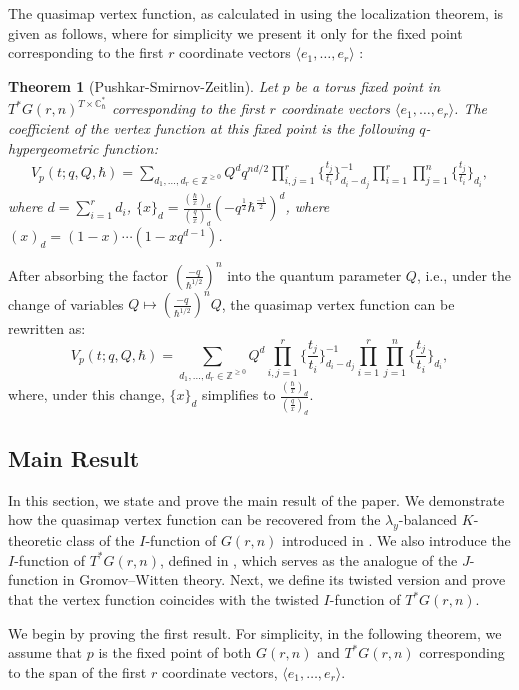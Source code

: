 \documentclass{amsart}
\newtheorem{thm}{Theorem}[section]
\begin{document}
The quasimap vertex function, as calculated in \cite[Proposition 4]{PSZ} using the localization theorem, is given as follows, where for simplicity we present it only for the fixed point corresponding to the first $r$ coordinate vectors $\langle e_{1},\dots,e_{r}\rangle$ :
    \begin{thm} [Pushkar-Smirnov-Zeitlin]
        \label{lemma:proj} Let $p$ be a torus fixed point in $T^*G(r,n)^{T \times \mathbb{C}_{\hbar}^*}$ corresponding to the first $r$ coordinate vectors $\langle e_1,\dots,e_r \rangle$. The coefficient of the vertex function at this fixed point is the following $q$-hypergeometric function:
\begin{align*}
    V_p(t;q,Q,\hbar) = \sum_{d_1,\dots,d_r \in \mathbb{Z}^{\geq 0}} Q^d q^{nd/2} \prod_{i,j=1}^r \{\frac{t_j}{t_i}\}_{d_i-d_j}^{-1}\prod_{i=1}^{r}\prod_{j=1}^{n}\{\frac{t_j}{t_i}\}_{d_i},
\end{align*}
where $d = \sum_{i=1}^r{d_i}$, $\{x\}_d = \frac{(\frac{\hbar}{x})_d}{(\frac{q}{x})_d}(-q^{\frac{1}{2}}\hbar^{\frac{-1}{2}})^d$, where $(x)_d = (1-x)\cdots(1-xq^{d-1})$. 
\end{thm}
After absorbing the factor $(\frac{-q}{\hbar^{1/2}})^n$ into the quantum parameter $Q$, i.e., under the change of variables $Q \mapsto (\frac{-q}{\hbar ^{1/2}})^{n}Q$, the quasimap vertex function can be rewritten as:
\[
V_p(t;q,Q,\hbar) = \sum_{d_1,\dots,d_r \in \mathbb{Z}^{\geq 0}} Q^d \prod_{i,j=1}^r \{\frac{t_j}{t_i}\}_{d_i-d_j}^{-1}\prod_{i=1}^{r}\prod_{j=1}^{n}\{\frac{t_j}{t_i}\}_{d_i},
\]
where, under this change, $\{x\}_d$ simplifies to $\frac{(\frac{\hbar}{x})_d}{(\frac{q}{x})_d}$.

\subsection{Main Result}\label{Main results}
In this section, we state and prove the main result of the paper. We demonstrate how the quasimap vertex function can be recovered from the $\lambda_y$-balanced $K$-theoretic class of the $I$-function of $G(r,n)$ introduced in . We also introduce the $I$-function of $T^*G(r,n)$, defined in \cite{wen2019ktheoreticifunctionvthetamathbfg}, which serves as the analogue of the $J$-function in Gromov--Witten theory. Next, we define its twisted version and prove that the vertex function coincides with the twisted $I$-function of $T^*G(r,n)$. 

 We begin by proving the first result. For simplicity, in the following theorem, we assume that $p$ is the fixed point of both $G(r,n)$ and $T^*G(r,n)$ corresponding to the span of the first $r$ coordinate vectors, $\langle e_{1},\dots,e_{r}\rangle$.
 
\end{document}
